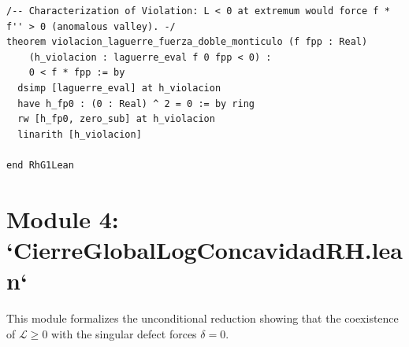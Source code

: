 \documentclass[11pt,a4paper]{article}
\theoremstyle{definition}
\theoremstyle{remark}
\begin{document}
\begin{lstlisting}[language=Lean4]
/-- Characterization of Violation: L < 0 at extremum would force f * f'' > 0 (anomalous valley). -/
theorem violacion_laguerre_fuerza_doble_monticulo (f fpp : Real)
    (h_violacion : laguerre_eval f 0 fpp < 0) :
    0 < f * fpp := by
  dsimp [laguerre_eval] at h_violacion
  have h_fp0 : (0 : Real) ^ 2 = 0 := by ring
  rw [h_fp0, zero_sub] at h_violacion
  linarith [h_violacion]

end RhG1Lean
\end{lstlisting}

\section{Module 4: `CierreGlobalLogConcavidadRH.lean`}

This module formalizes the unconditional reduction showing that the coexistence of $\mathcal{L} \ge 0$ with the singular defect forces $\delta = 0$.
\end{document}
